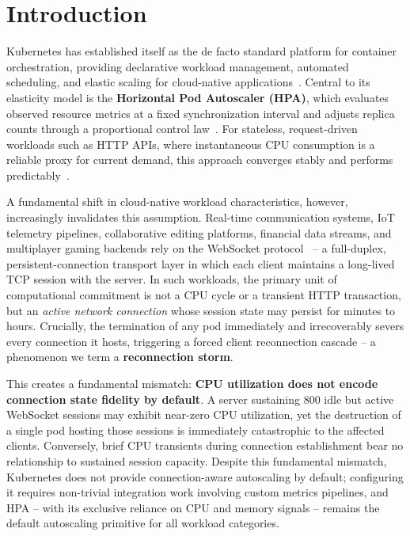 \documentclass[twocolumn]{svjour3}
\begin{document}
\section{Introduction}
\label{sec:intro}

Kubernetes has established itself as the de facto standard platform for container orchestration, providing declarative workload management, automated scheduling, and elastic scaling for cloud-native applications~\cite{burns2016borg,verma2015large}. Central to its elasticity model is the \textbf{Horizontal Pod Autoscaler (HPA)}, which evaluates observed resource metrics at a fixed synchronization interval and adjusts replica counts through a proportional control law~\cite{k8s_hpa_docs,nguyen2020hpa}. For stateless, request-driven workloads such as HTTP APIs, where instantaneous CPU consumption is a reliable proxy for current demand, this approach converges stably and performs predictably~\cite{casalicchio2019auto,qu2018auto}.

A fundamental shift in cloud-native workload characteristics, however, increasingly invalidates this assumption. Real-time communication systems, IoT telemetry pipelines, collaborative editing platforms, financial data streams, and multiplayer gaming backends rely on the WebSocket protocol~\cite{websocket_rfc} -- a full-duplex, persistent-connection transport layer in which each client maintains a long-lived TCP session with the server. In such workloads, the primary unit of computational commitment is not a CPU cycle or a transient HTTP transaction, but an \textit{active network connection} whose session state may persist for minutes to hours. Crucially, the termination of any pod immediately and irrecoverably severs every connection it hosts, triggering a forced client reconnection cascade -- a phenomenon we term a \textbf{reconnection storm}.

This creates a fundamental mismatch: \textbf{CPU utilization does not encode connection state fidelity by default}. A server sustaining 800 idle but active WebSocket sessions may exhibit near-zero CPU utilization, yet the destruction of a single pod hosting those sessions is immediately catastrophic to the affected clients. Conversely, brief CPU transients during connection establishment bear no relationship to sustained session capacity. Despite this fundamental mismatch, Kubernetes does not provide connection-aware autoscaling by default; configuring it requires non-trivial integration work involving custom metrics pipelines, and HPA -- with its exclusive reliance on CPU and memory signals -- remains the default autoscaling primitive for all workload categories.
\end{document}
